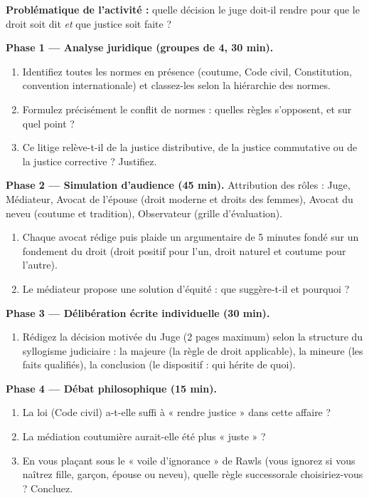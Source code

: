 \documentclass[11pt]{article}
\newcounter{popsec}
\newcounter{popsub}
\newcommand{\courssub}[1]{%
  \stepcounter{popsub}%
  \par\vspace{9pt}\noindent{\popxbold\fontsize{11.5}{13}\selectfont\color{popink}{\color{poporange}\thepopsec.\thepopsub}\hspace{6pt}#1}\par\nopagebreak\vspace{4pt}
}
\begin{document}
\textbf{Problématique de l'activité :} quelle décision le juge doit-il rendre pour que le droit soit dit \emph{et} que justice soit faite ?

\courssub{Consignes}

\textbf{Phase 1 — Analyse juridique (groupes de 4, 30 min).}
\begin{enumerate}
\item Identifiez toutes les normes en présence (coutume, Code civil, Constitution, convention internationale) et classez-les selon la hiérarchie des normes.
\item Formulez précisément le conflit de normes : quelles règles s'opposent, et sur quel point ?
\item Ce litige relève-t-il de la justice distributive, de la justice commutative ou de la justice corrective ? Justifiez.
\end{enumerate}

\textbf{Phase 2 — Simulation d'audience (45 min).} Attribution des rôles : Juge, Médiateur, Avocat de l'épouse (droit moderne et droits des femmes), Avocat du neveu (coutume et tradition), Observateur (grille d'évaluation).
\begin{enumerate}
\item Chaque avocat rédige puis plaide un argumentaire de 5 minutes fondé sur un fondement du droit (droit positif pour l'un, droit naturel et coutume pour l'autre).
\item Le médiateur propose une solution d'équité : que suggère-t-il et pourquoi ?
\end{enumerate}

\textbf{Phase 3 — Délibération écrite individuelle (30 min).}
\begin{enumerate}
\item Rédigez la décision motivée du Juge (2 pages maximum) selon la structure du syllogisme judiciaire : la majeure (la règle de droit applicable), la mineure (les faits qualifiés), la conclusion (le dispositif : qui hérite de quoi).
\end{enumerate}

\textbf{Phase 4 — Débat philosophique (15 min).}
\begin{enumerate}
\item La loi (Code civil) a-t-elle suffi à « rendre justice » dans cette affaire ?
\item La médiation coutumière aurait-elle été plus « juste » ?
\item En vous plaçant sous le « voile d'ignorance » de Rawls (vous ignorez si vous naîtrez fille, garçon, épouse ou neveu), quelle règle successorale choisiriez-vous ? Concluez.
\end{enumerate}
\end{document}
